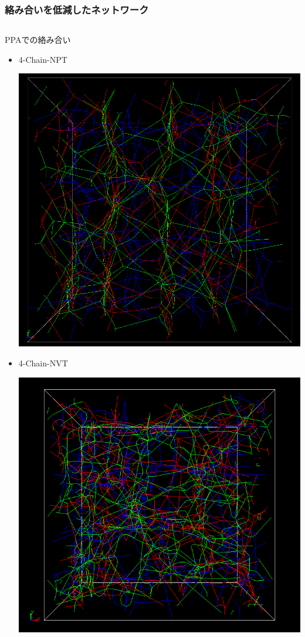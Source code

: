 \documentclass[12pt, dvipdfmx]{beamer}
\begin{document}
\begin{frame}
    \frametitle{絡み合いを低減したネットワーク}
        \vspace{-3mm}
		\begin{columns}[T, onlytextwidth]
			\begin{exampleblock}{PPAでの絡み合い}
				\small
				\begin{itemize}
					\item 4-Chain-\alert{NPT}
					
					\includegraphics[width=.58\textwidth]{NPT_PPA.png}
					\item 4-Chain-NVT
					
					\includegraphics[width=.58\textwidth]{N48_f4_PPA.png}
				\end{itemize}
			\end{exampleblock}
                

\end{columns}
\end{frame}
\end{document}
